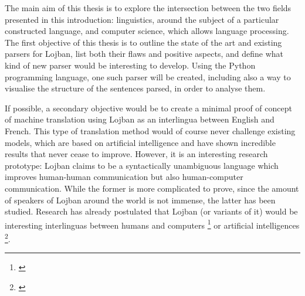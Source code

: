 The main aim of this thesis is to explore the intersection between the two fields presented in this introduction: linguistics, around the subject of a particular constructed
language, and computer science, which allows language processing. The first objective of this thesis is to outline the state of the art and existing parsers for Lojban, list both
their flaws and positive aspects, and define what kind of new parser would be interesting to develop. Using the Python programming language, one such parser will be created, including
also a way to visualise the structure of the sentences parsed, in order to analyse them.\newline

If possible, a secondary objective would be to create a minimal proof of concept of machine translation using Lojban as an interlingua between English and French. This type of translation
method would of course never challenge existing models, which are based on artificial intelligence and have shown incredible results that never cease to improve. However, it is an interesting
research prototype: Lojban claims to be a syntactically unambiguous language which improves human-human communication but also human-computer communication. While the former is more complicated
to prove, since the amount of speakers of Lojban around the world is not immense, the latter has been studied. Research has already postulated that Lojban (or variants of it) would be interesting
interlinguas between humans and computers \footnote{\cite{speer2004meeting}} or artificial intelligences \footnote{\cite{goertzel2013lojban}}.
